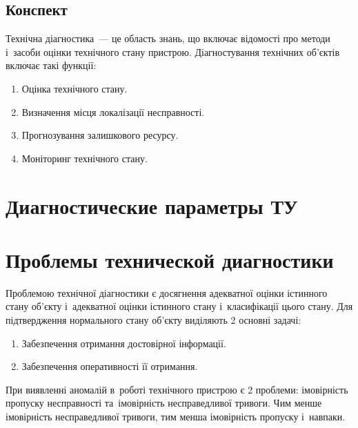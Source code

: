 \documentclass[
	a4paper,
	oneside,
	DIV = 14,
	fontsize = 14pt,
	headings = normal,
]{scrartcl}
\begin{document}
		\subsection{Конспект}
			Технічна діагностика~— це область знань, що включає відомості про методи і~засоби оцінки технічного стану пристрою. Діагностування технічних об'єктів включає такі функції:
			\begin{enumerate}
				\item Оцінка технічного стану.
				\item Визначення місця локалізації несправності.
				\item Прогнозування залишкового ресурсу.
				\item Моніторинг технічного стану.
			\end{enumerate}

	\section{Диагностические параметры ТУ}


	\section{Проблемы технической диагностики}
			Проблемою технічної діагностики є досягнення адекватної оцінки істинного стану об'єкту і~адекватної оцінки істинного стану і~класифікації цього стану. Для підтвердження нормального стану об'єкту виділяють 2 основні задачі:
			\begin{enumerate}
				\item Забезпечення отримання достовірної інформації.
				\item Забезпечення оперативності її отримання.
			\end{enumerate}

			При виявленні аномалій в~роботі технічного пристрою є 2 проблеми: імовірність пропуску несправності та~імовірність несправедливої тривоги. Чим менше імовірність несправедливої тривоги, тим менша імовірність пропуску і~навпаки.
\end{document}

